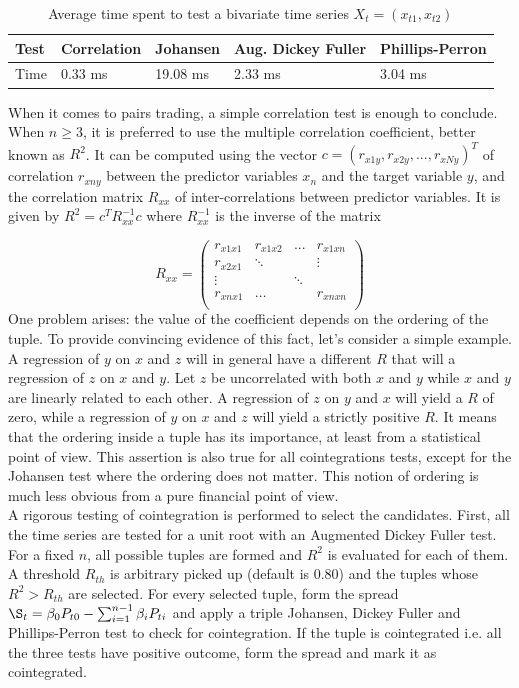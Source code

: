 \documentclass[11pt,a4,twosided,singlespacing,titlepagenumber=on]{scrreprt}
\numberwithin{equation}{chapter} %
\theoremstyle{remark}
\begin{document}
\begin{table}[h]
\centering
\label{table1}
\begin{tabular}{|l|l|l|l|l|}
\hline
Test     & Correlation & Johansen & Aug. Dickey Fuller & Phillips-Perron \\ \hline
Time & 0.33 ms   & 19.08 ms      & 2.33 ms      & 3.04 ms        \\ \hline
\end{tabular}
\caption{Average time spent to test a bivariate time series $X_t = (x_{t1}, x_{t2})$}
\end{table}

\noindent
When it comes to pairs trading, a simple correlation test is enough to conclude. When $n \geq 3$, it is preferred to use the multiple correlation coefficient, better known as $R^2$. It can be computed using the vector $c = (r_{x1y}, r_{x2y},...,r_{xNy})^T$ of correlation $r_{xny}$ between the predictor variables $x_n$ and the target variable $y$, and the correlation matrix $R_{xx}$ of inter-correlations between predictor variables. It is given by $R^2 = c^T R_{xx}^{-1}c$ where $R_{xx}^{-1}$ is the inverse of the matrix

$$R_{xx} =\begin{pmatrix}
r_{x1x1}    & r_{x1x2} & ...  & r_{x1xn}  \\
r_{x2x1}    & \ddots &   & \vdots  \\
\vdots       &   & \ddots &   \\
r_{xnx1}    & \hdots &   & r_{xnxn} \\
\end{pmatrix} $$
One problem arises: the value of the coefficient depends on the ordering of the tuple. To provide convincing evidence of this fact, let's consider a simple example. A regression of $y$ on $x$ and $z$ will in general have a different $R$ that will a regression of $z$ on $x$ and $y$. Let $z$ be uncorrelated with both $x$ and $y$ while $x$ and $y$ are linearly related to each other. A regression of $z$ on $y$ and $x$ will yield a $R$ of zero, while a regression of $y$ on $x$ and $z$ will yield a strictly positive $R$. It means that the ordering inside a tuple has its importance, at least from a statistical point of view. This assertion is also true for all cointegrations tests, except for the Johansen test where the ordering does not matter. This notion of ordering is much less obvious from a pure financial point of view. \\

\noindent
A rigorous testing of cointegration is performed to select the candidates. First, all the time series are tested for a unit root with an Augmented Dickey Fuller test. For a fixed $n$, all possible tuples are formed and $R^2$ is evaluated for each of them. A threshold $R_{th}$ is arbitrary picked up (default is 0.80) and the tuples whose $R^2> R_{th}$ are selected. For every selected tuple, form the spread $\S_t = \beta_0 P_{t0} - \sum_{i=1}^{n-1} \beta_i P_{ti}$ and apply a triple Johansen, Dickey Fuller and Phillips-Perron test to check for cointegration. If the tuple is cointegrated i.e. all the three tests have positive outcome, form the spread and mark it as cointegrated.
\end{document}
